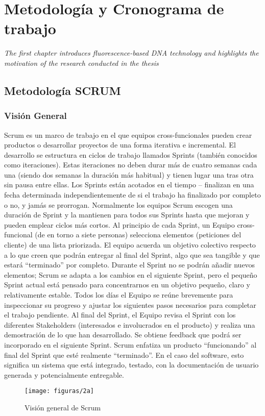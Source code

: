 \chapter{Metodología y Cronograma de trabajo}
\label{chap:coloso}
\textit{The first chapter introduces fluorescence-based DNA technology and highlights the motivation of the research conducted in the thesis}
\vfill
\minitoc
\newpage

\section{Metodología SCRUM}
\subsection{Visión General}
Scrum es un marco de trabajo en el que equipos cross-funcionales pueden crear productos o desarrollar proyectos de una forma iterativa e incremental. El desarrollo se estructura en ciclos de trabajo llamados Sprints (también conocidos como iteraciones). Estas iteraciones no deben durar más de cuatro semanas cada una (siendo dos semanas la duración más habitual) y tienen lugar una tras otra sin pausa entre ellas. Los Sprints están acotados en el tiempo – finalizan en una fecha determinada independientemente de si el trabajo ha finalizado por completo o no, y jamás se prorrogan. Normalmente los equipos Scrum escogen una duración de Sprint y la mantienen para todos sus Sprints hasta que mejoran y pueden emplear ciclos más cortos. Al principio de cada Sprint, un Equipo cross-funcional (de en torno a siete personas) selecciona elementos (peticiones del cliente) de una lista priorizada. El equipo acuerda un objetivo colectivo respecto a lo que creen que podrán entregar al final del Sprint, algo que sea tangible y que estará “terminado” por completo. Durante el Sprint no se podrán añadir nuevos elementos; Scrum se adapta a los cambios en el siguiente Sprint, pero el pequeño Sprint actual está pensado para concentrarnos en un objetivo pequeño, claro y relativamente estable. Todos los días el Equipo se reúne brevemente para inspeccionar su progreso y ajustar los siguientes pasos necesarios para completar el trabajo pendiente. Al final del Sprint, el Equipo revisa el Sprint con los diferentes Stakeholders (interesados e involucrados en el producto) y realiza una demostración de lo que han desarrollado. Se obtiene feedback que podrá ser incorporado en el siguiente Sprint. Scrum enfatiza un producto “funcionando” al final del Sprint que esté realmente “terminado”. En el caso del software, esto significa un sistema que está integrado, testado, con la documentación de usuario generada y potencialmente entregable.
  \begin{figure}[H]
  	\centering
  	\texttt{[image: figuras/2a]}
  	\captionsetup{width=.95\textwidth}
  	\caption{Visión general de Scrum}
  	\label{figura2a}
  \end{figure}

